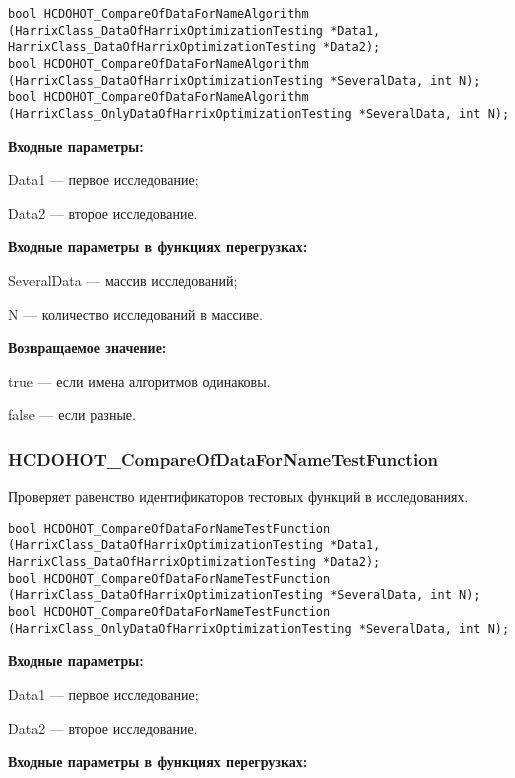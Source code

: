 \documentclass[a4paper,12pt]{article}
\begin{document}
\begin{lstlisting}[label=code_syntax_HCDOHOT_CompareOfDataForNameAlgorithm,caption=Синтаксис]
bool HCDOHOT_CompareOfDataForNameAlgorithm (HarrixClass_DataOfHarrixOptimizationTesting *Data1, HarrixClass_DataOfHarrixOptimizationTesting *Data2);
bool HCDOHOT_CompareOfDataForNameAlgorithm (HarrixClass_DataOfHarrixOptimizationTesting *SeveralData, int N);
bool HCDOHOT_CompareOfDataForNameAlgorithm (HarrixClass_OnlyDataOfHarrixOptimizationTesting *SeveralData, int N);
\end{lstlisting}

\textbf{Входные параметры:}

Data1 --- первое исследование;
 
Data2 --- второе исследование.
	 
\textbf{Входные параметры в функциях перегрузках:}

SeveralData --- массив исследований;
 
N --- количество исследований в массиве.

\textbf{Возвращаемое значение:}

true --- если имена алгоритмов одинаковы.
 
false --- если разные.


\subsubsection{HCDOHOT\_CompareOfDataForNameTestFunction}\label{HCDOHOT_CompareOfDataForNameTestFunction}

Проверяет равенство идентификаторов тестовых функций в исследованиях.


\begin{lstlisting}[label=code_syntax_HCDOHOT_CompareOfDataForNameTestFunction,caption=Синтаксис]
bool HCDOHOT_CompareOfDataForNameTestFunction (HarrixClass_DataOfHarrixOptimizationTesting *Data1, HarrixClass_DataOfHarrixOptimizationTesting *Data2);
bool HCDOHOT_CompareOfDataForNameTestFunction (HarrixClass_DataOfHarrixOptimizationTesting *SeveralData, int N);
bool HCDOHOT_CompareOfDataForNameTestFunction (HarrixClass_OnlyDataOfHarrixOptimizationTesting *SeveralData, int N);
\end{lstlisting}

\textbf{Входные параметры:}

Data1 --- первое исследование;
 
Data2 --- второе исследование.
	 
\textbf{Входные параметры в функциях перегрузках:}
\end{document}
